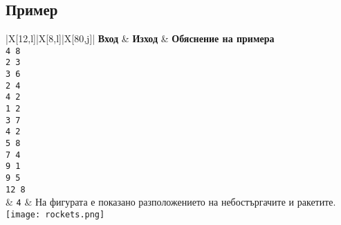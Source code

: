 \documentclass[12pt]{article}
\begin{document}
\subsection{Пример}
\begin{table}[H]
	\begin{tblr}{|X[12,l]|X[8,l]|X[80,j]|}
		\hline
		\textbf{Вход} & \textbf{Изход} & \textbf{Обяснение на примера} \\
		\hline
		\texttt{4 8  \\
2 3 \\
3 6 \\
2 4 \\
4 2 \\
1 2 \\
3 7 \\
4 2 \\
5 8 \\
7 4 \\
9 1 \\
9 5 \\
12 8 \\
}
		& 
		\texttt{4}
		& 
		{На фигурата е показано разположението на небостъргачите и ракетите. \\
        \texttt{[image: rockets.png]}
        } \\
		\hline
	\end{tblr} 
\end{table}
\FloatBarrier
\end{document}
